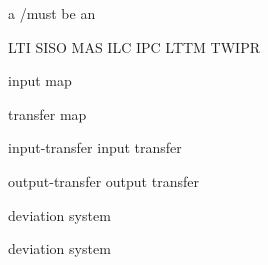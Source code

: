 a  /must be an




\glsxtrfull{}
LTI
SISO
MAS
ILC
IPC
LTTM
TWIPR


input map

transfer map

input-transfer
input transfer

output-transfer
output transfer

deviation system

deviation system





